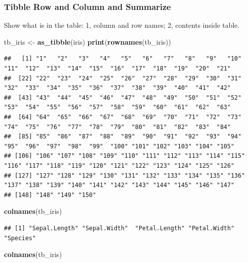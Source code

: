 \documentclass[
]{book}
\newenvironment{Shaded}{\begin{snugshade}}{\end{snugshade}}
\newcommand{\KeywordTok}[1]{\textcolor[rgb]{0.13,0.29,0.53}{\textbf{#1}}}
\newcommand{\NormalTok}[1]{#1}
\newcommand{\StringTok}[1]{\textcolor[rgb]{0.31,0.60,0.02}{#1}}
\begin{document}
\hypertarget{tibble-row-and-column-and-summarize}{%
\subsubsection{Tibble Row and Column and Summarize}\label{tibble-row-and-column-and-summarize}}

Show what is in the table: 1, column and row names; 2, contents inside table.

\begin{Shaded}
\begin{Highlighting}[]
\NormalTok{tb\_iris \textless{}{-}}\StringTok{ }\KeywordTok{as\_tibble}\NormalTok{(iris)}
\KeywordTok{print}\NormalTok{(}\KeywordTok{rownames}\NormalTok{(tb\_iris))}
\end{Highlighting}
\end{Shaded}

\begin{verbatim}
##   [1] "1"   "2"   "3"   "4"   "5"   "6"   "7"   "8"   "9"   "10"  "11"  "12"  "13"  "14"  "15"  "16"  "17"  "18"  "19"  "20"  "21" 
##  [22] "22"  "23"  "24"  "25"  "26"  "27"  "28"  "29"  "30"  "31"  "32"  "33"  "34"  "35"  "36"  "37"  "38"  "39"  "40"  "41"  "42" 
##  [43] "43"  "44"  "45"  "46"  "47"  "48"  "49"  "50"  "51"  "52"  "53"  "54"  "55"  "56"  "57"  "58"  "59"  "60"  "61"  "62"  "63" 
##  [64] "64"  "65"  "66"  "67"  "68"  "69"  "70"  "71"  "72"  "73"  "74"  "75"  "76"  "77"  "78"  "79"  "80"  "81"  "82"  "83"  "84" 
##  [85] "85"  "86"  "87"  "88"  "89"  "90"  "91"  "92"  "93"  "94"  "95"  "96"  "97"  "98"  "99"  "100" "101" "102" "103" "104" "105"
## [106] "106" "107" "108" "109" "110" "111" "112" "113" "114" "115" "116" "117" "118" "119" "120" "121" "122" "123" "124" "125" "126"
## [127] "127" "128" "129" "130" "131" "132" "133" "134" "135" "136" "137" "138" "139" "140" "141" "142" "143" "144" "145" "146" "147"
## [148] "148" "149" "150"
\end{verbatim}

\begin{Shaded}
\begin{Highlighting}[]
\KeywordTok{colnames}\NormalTok{(tb\_iris)}
\end{Highlighting}
\end{Shaded}

\begin{verbatim}
## [1] "Sepal.Length" "Sepal.Width"  "Petal.Length" "Petal.Width"  "Species"
\end{verbatim}

\begin{Shaded}
\begin{Highlighting}[]
\KeywordTok{colnames}\NormalTok{(tb\_iris)}
\end{Highlighting}
\end{Shaded}
\end{document}
